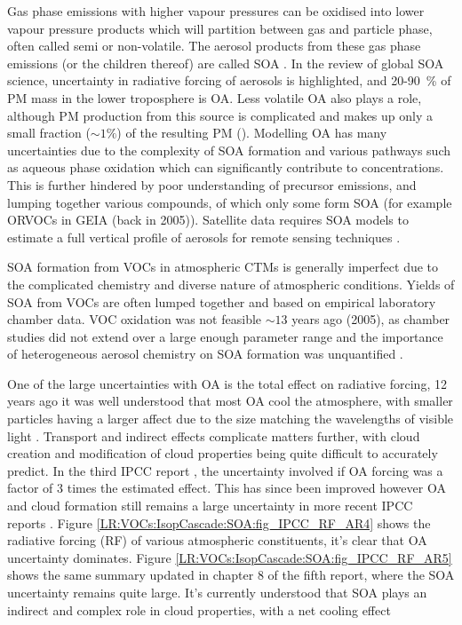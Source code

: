     
    Gas phase emissions with higher vapour pressures can be oxidised into lower vapour pressure products which will partition between gas and particle phase, often called semi or non-volatile. 
    The aerosol products from these gas phase emissions (or the children thereof) are called SOA \citep{Kanakidou2005}.
    In the \cite{Kanakidou2005} review of global SOA science, uncertainty in radiative forcing of aerosols is highlighted, and 20-90~\% of PM mass in the lower troposphere is OA.
    Less volatile OA also plays a role, although PM production from this source is complicated and makes up only a small fraction ($\sim 1 \%$) of the resulting PM (\cite{Kroll2008, Bei2012}).
    Modelling OA has many uncertainties due to the complexity of SOA formation and various pathways such as aqueous phase oxidation which can significantly contribute to concentrations.
    This is further hindered by poor understanding of precursor emissions, and lumping together various compounds, of which only some form SOA (for example ORVOCs in GEIA (back in 2005)).
    Satellite data requires SOA models to estimate a full vertical profile of aerosols for remote sensing techniques \citep{Kanakidou2005}.
    
    SOA formation from VOCs in atmospheric CTMs is generally imperfect due to the complicated chemistry and diverse nature of atmospheric conditions.
    Yields of SOA from VOCs are often lumped together and based on empirical laboratory chamber data. 
    VOC oxidation was not feasible $\sim 13$ years ago (2005), as chamber studies did not extend over a large enough parameter range and the importance of heterogeneous aerosol chemistry on SOA formation was unquantified \citep{Kanakidou2005}.
    
    One of the large uncertainties with OA is the total effect on radiative forcing, 12 years ago it was well understood that most OA cool the atmosphere, with smaller particles having a larger affect due to the size matching the wavelengths of visible light \citep{Kanakidou2005}. 
    Transport and indirect effects complicate matters further, with cloud creation and modification of cloud properties being quite difficult to accurately predict.
    In the third IPCC report \citep{IPCC2001}, the uncertainty involved if OA forcing was a factor of 3 times the estimated effect. 
    This has since been improved however OA and cloud formation still remains a large uncertainty in more recent IPCC reports \citep{IPCC_Chapter2}.
    Figure \ref{LR:VOCs:IsopCascade:SOA:fig_IPCC_RF_AR4} shows the radiative forcing (RF) of various atmospheric constituents, it's clear that OA uncertainty dominates.
    Figure \ref{LR:VOCs:IsopCascade:SOA:fig_IPCC_RF_AR5} shows the same summary updated in chapter 8 of the fifth report, where the SOA uncertainty remains quite large.
    It's currently understood that SOA plays an indirect and complex role in cloud properties, with a net cooling effect \citep[Chapter 7,8]{IPCC_AR5_WG1}
    
